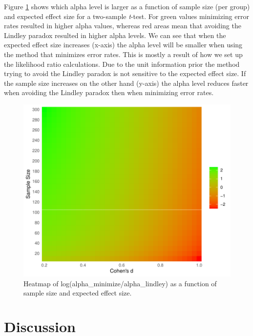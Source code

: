 \documentclass[
  english,
  ,man,floatsintext]{apa6}
\begin{document}
Figure \ref{fig:heatmap} shows which alpha level is larger as a function of sample size (per group) and expected effect size for a two-sample \emph{t}-test. For green values minimizing error rates resulted in higher alpha values, whereas red areas mean that avoiding the Lindley paradox resulted in higher alpha levels. We can see that when the expected effect size increases (x-axis) the alpha level will be smaller when using the method that minimizes error rates. This is mostly a result of how we set up the likelihood ratio calculations. Due to the unit information prior the method trying to avoid the Lindley paradox is not sensitive to the expected effect size. If the sample size increases on the other hand (y-axis) the alpha level reduces faster when avoiding the Lindley paradox then when minimizing error rates.

\begin{figure}
\centering
\includegraphics{Justify_in_Practice_files/figure-latex/heatmap-1.pdf}
\caption{\label{fig:heatmap}Heatmap of log(alpha\_minimize/alpha\_lindley) as a function of sample size and expected effect size.}
\end{figure}

\hypertarget{discussion}{%
\section{Discussion}\label{discussion}}
\end{document}
